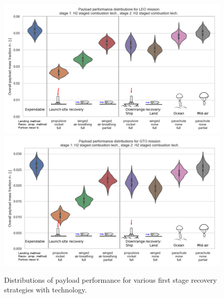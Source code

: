 \documentclass[conf]{new-aiaa}
\begin{document}
\begin{figure}[hbt!]
    \centering
    \includegraphics[width=\textwidth]{strategy_perf_annotated/LEO_H2}
    \includegraphics[width=\textwidth]{strategy_perf_annotated/GTO_H2}
    \caption{\label{fig:strategy_perf_H2} Distributions of payload performance for various first stage recovery strategies with  technology.}
\end{figure}


\end{document}
